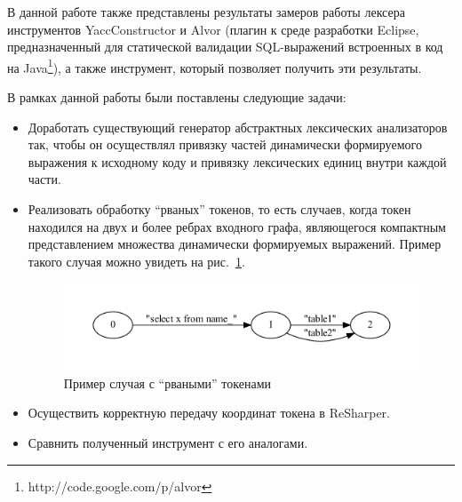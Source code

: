 В данной работе также представлены результаты замеров работы лексера инструментов YaccConstructor и Alvor (плагин к среде разработки Eclipse,
предназначенный для статической валидации SQL-выражений встроенных в код на Java\footnote{http://code.google.com/p/alvor}), а также инструмент, который позволяет получить 
эти результаты.


В рамках данной работы были поставлены следующие задачи:
\begin{itemize}
\item Доработать существующий генератор абстрактных лексических анализаторов так, чтобы он осуществлял привязку частей динамически 
формируемого выражения к исходному коду и привязку лексических единиц внутри каждой части.
\item Реализовать обработку “рваных” токенов, то есть случаев, когда токен находился на двух и более ребрах входного графа, являющегося 
компактным представлением множества динамически формируемых выражений. Пример такого случая можно увидеть на рис.~\ref{fig:example_break}.

\begin{figure}[t]
\centering
\includegraphics[width=\textwidth]{Polubelova/example_break}
\caption{Пример случая с ``рваными'' токенами}
\label{fig:example_break} 
\end{figure}

\item Осуществить корректную передачу координат токена в ReSharper.
\item Сравнить полученный инструмент с его аналогами.
\end{itemize}

